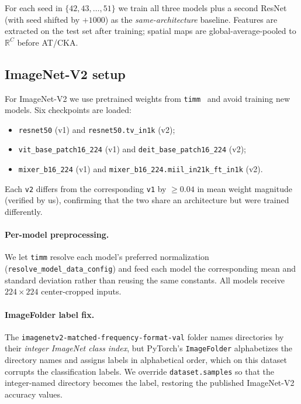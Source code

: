 \documentclass[11pt]{article}
\begin{document}
For each seed in $\{42, 43, \dots, 51\}$ we train all three models
plus a second ResNet (with seed shifted by $+1000$) as the
\emph{same-architecture} baseline. Features are extracted on the test
set after training; spatial maps are global-average-pooled to
$\mathbb{R}^C$ before AT/CKA.

\subsection{ImageNet-V2 setup}

For ImageNet-V2 we use pretrained weights from
\texttt{timm}~\cite{wightman2019timm} and avoid training new models.
Six checkpoints are loaded:
\begin{itemize}
\item \texttt{resnet50} (v1) and \texttt{resnet50.tv\_in1k} (v2);
\item \texttt{vit\_base\_patch16\_224} (v1) and
      \texttt{deit\_base\_patch16\_224} (v2);
\item \texttt{mixer\_b16\_224} (v1) and
      \texttt{mixer\_b16\_224.miil\_in21k\_ft\_in1k} (v2).
\end{itemize}
Each \texttt{v2} differs from the corresponding \texttt{v1} by
$\ge 0.04$ in mean weight magnitude (verified by us), confirming that
the two share an architecture but were trained differently.

\paragraph{Per-model preprocessing.} We let \texttt{timm} resolve each
model's preferred normalization (\texttt{resolve\_model\_data\_config})
and feed each model the corresponding mean and standard deviation rather
than reusing the same constants. All models receive
$224 \times 224$ center-cropped inputs.

\paragraph{ImageFolder label fix.} The
\texttt{imagenetv2-matched-frequency-format-val} folder names directories
by their \emph{integer ImageNet class index}, but PyTorch's
\texttt{ImageFolder} alphabetizes the directory names and assigns labels
in alphabetical order, which on this dataset corrupts the
classification labels. We override
\texttt{dataset.samples} so that the integer-named directory becomes the
label, restoring the published ImageNet-V2 accuracy values.
\end{document}

